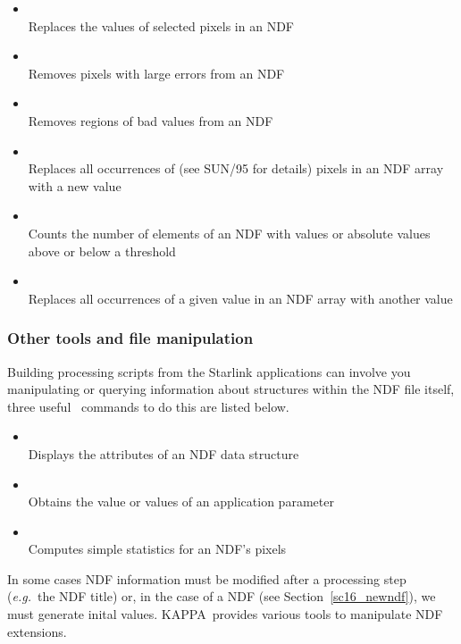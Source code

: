\documentclass[twoside,11pt]{starlink}
\providecommand{\KAPPA}{{\footnotesize KAPPA}\normalsize}
\providecommand{\KAPPAref}{\xref{\KAPPA}{sun95}{}}
\begin{document}
\begin{itemize}
\item{}\\
Replaces the values of selected pixels in an NDF
\item{}\\
Removes pixels with large errors from an NDF
\item{}\\
Removes regions of bad values from an NDF
\item{}\\
Replaces all occurrences of  (see SUN/95 for details)
pixels in an NDF array with a new value
\item{}\\
Counts the number of elements of an NDF with values or absolute values above or below a threshold
\item{}\\
Replaces all occurrences of a given value in an NDF array with another value
\end{itemize}

\subsubsection{Other tools and file manipulation}

Building processing scripts from the Starlink applications can involve
you manipulating or querying information about structures within the
NDF file itself, three useful \KAPPAref\ commands to do this are listed
below.

\begin{itemize}
\item{}\\
Displays the attributes of an NDF data structure
\item{}\\
Obtains the value or values of an application parameter
\item{}\\
Computes simple statistics for an NDF's pixels
\end{itemize}

In some cases NDF information must be modified after a processing step
(\emph{e.g.}\ the NDF title) or, in the case of a  NDF (see Section~\ref{sc16_newndf}),
we must generate inital values.  \KAPPA\ provides various tools to
manipulate NDF extensions.
\end{document}
